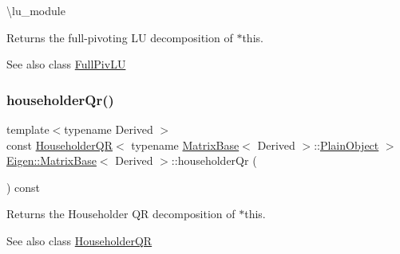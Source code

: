 \textbackslash{}lu\+\_\+module

\begin{DoxyReturn}{Returns}
the full-\/pivoting LU decomposition of {\ttfamily $\ast$this}.
\end{DoxyReturn}
\begin{DoxySeeAlso}{See also}
class \mbox{\hyperlink{class_eigen_1_1_full_piv_l_u}{Full\+Piv\+LU}} 
\end{DoxySeeAlso}
\mbox{\label{class_eigen_1_1_matrix_base_a9a9377aab1cea26db5f25bab7e682f8f}} 
\subsubsection{\texorpdfstring{householderQr()}{householderQr()}}
{\footnotesize\ttfamily template$<$typename Derived $>$ \\
const \mbox{\hyperlink{class_eigen_1_1_householder_q_r}{Householder\+QR}}$<$ typename \mbox{\hyperlink{class_eigen_1_1_matrix_base}{Matrix\+Base}}$<$ Derived $>$\+::\mbox{\hyperlink{class_eigen_1_1_dense_base_aae45af9b5aca5a9caae98fd201f47cc4}{Plain\+Object}} $>$ \mbox{\hyperlink{class_eigen_1_1_matrix_base}{Eigen\+::\+Matrix\+Base}}$<$ Derived $>$\+::householder\+Qr (\begin{DoxyParamCaption}{ }\end{DoxyParamCaption}) const\hspace{0.3cm}{\ttfamily [inline]}}

\begin{DoxyReturn}{Returns}
the Householder QR decomposition of {\ttfamily $\ast$this}.
\end{DoxyReturn}
\begin{DoxySeeAlso}{See also}
class \mbox{\hyperlink{class_eigen_1_1_householder_q_r}{Householder\+QR}} 
\end{DoxySeeAlso}
\mbox{\label{class_eigen_1_1_matrix_base_a32222d3b6677e6cdf0b801463f329b72}} 
